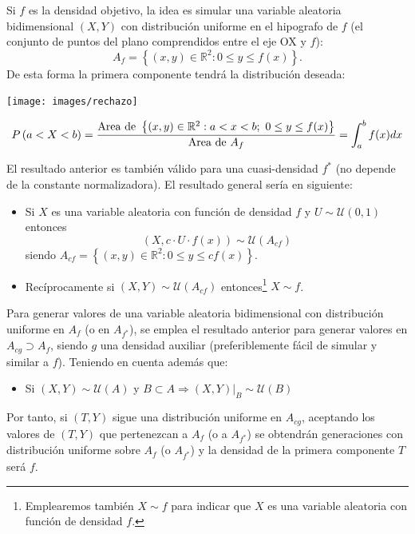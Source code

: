 \documentclass[
]{book}
\providecommand{\tightlist}{%
  \setlength{\itemsep}{0pt}\setlength{\parskip}{0pt}}
\theoremstyle{break}
\theoremstyle{definition}
\theoremstyle{definition}
\theoremstyle{definition}
\theoremstyle{remark}
\begin{document}
Si \(f\) es la densidad objetivo, la idea es simular una variable aleatoria
bidimensional \(\left( X, Y\right)\) con distribución
uniforme en el hipografo de \(f\) (el conjunto de puntos del plano
comprendidos entre el eje OX y \(f\)):
\[A_{f}=\left\{ \left( x,y\right) \in \mathbb{R}^{2}:0\leq y\leq
f(x) \right\}.\]
De esta forma la primera componente tendrá la distribución deseada:

\begin{center}\texttt{[image: images/rechazo]} \end{center}

\[ P\left( a<X<b\right) = \frac{\text{Area de }\left\{ \left( x,y\right) \in 
\mathbb{R}^{2}:a<x<b;~0\leq y\leq f(x) \right\} }{\text{Area de }
A_{f}} \\
= \int_{a}^{b}f(x) dx \]

El resultado anterior es también válido para una cuasi-densidad \(f^{\ast}\)
(no depende de la constante normalizadora).
El resultado general sería en siguiente:

\begin{itemize}
\item
  Si \(X\) es una variable aleatoria con función de densidad \(f\)
  y \(U \sim \mathcal{U}(0, 1)\) entonces
  \[\left( X,c\cdot U\cdot f(x) \right) \sim \mathcal{U}\left(
  A_{cf}\right)\]
  siendo
  \(A_{cf}=\left\{ \left( x, y \right) \in \mathbb{R}^{2} : 0 \leq y \leq cf\left( x \right) \right\}\).
\item
  Recíprocamente si \(\left( X,Y\right) \sim \mathcal{U}\left(A_{cf}\right)\) entonces\footnote{Emplearemos también \(X\sim f\) para indicar que \(X\) es una variable aleatoria con función de densidad \(f\).} \(X\sim f\).
\end{itemize}

Para generar valores de una variable aleatoria bidimensional con distribución uniforme
en \(A_{f}\) (o en \(A_{f^{\ast }}\)), se emplea el resultado anterior para
generar valores en \(A_{cg} \supset A_{f}\), siendo \(g\) una densidad auxiliar
(preferiblemente fácil de simular y similar a \(f\)).
Teniendo en cuenta además que:

\begin{itemize}
\tightlist
\item
  Si \(\left( X,Y\right) \sim \mathcal{U}\left( A\right)\) y
  \(B \subset A\Rightarrow \left. \left( X,Y\right) \right\vert _{B} \sim \mathcal{U}\left(B\right)\)
\end{itemize}

Por tanto, si \(\left( T, Y \right)\) sigue una distribución
uniforme en \(A_{cg}\), aceptando los valores de
\(\left( T, Y\right)\) que pertenezcan a \(A_{f}\) (o a \(A_{f^{\ast }}\)) se obtendrán
generaciones con distribución uniforme sobre \(A_{f}\) (o \(A_{f^{\ast }}\))
y la densidad de la primera componente \(T\) será \(f\).
\end{document}
